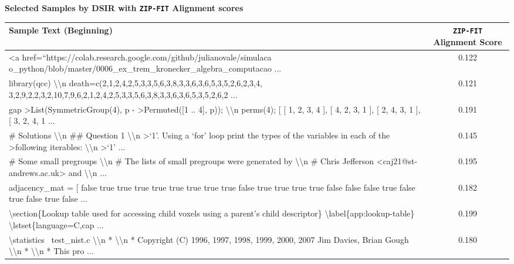 \begin{table}[htbp]
    \centering
    \textbf{Selected Samples by DSIR with \texttt{ZIP-FIT} Alignment scores}\\[0.5em] 
    \begin{tabular}{|p{10cm}|c|}
        \hline
        \textbf{Sample Text (Beginning)} & \textbf{\texttt{ZIP-FIT} Alignment Score} \\ \hline
        \textless a href=``https://colab.research.google.com/github/julianovale/simulaca
        o\_python/blob/master/0006\_ex\_trem\_kronecker\_algebra\_computacao ... & 0.122 \\ 
        \hline
        library(qcc) \textbackslash\textbackslash n
        death=c(2,1,2,4,2,5,3,3,5,6,3,8,3,3,6,3,6,5,3,5,2,6,2,3,4,
        3,2,9,2,2,3,2,10,7,9,6,2,1,2,4,2,5,3,3,5,6,3,8,3,3,6,3,6,5,3,5,2,6,2 ... & 0.121 \\ 
        \hline
        gap \textgreater List(SymmetricGroup(4), p - \textgreater Permuted([1 .. 4], p)); \textbackslash\textbackslash n perms(4);
        [ [ 1, 2, 3, 4 ], [ 4, 2, 3, 1 ], [ 2, 4, 3, 1 ], [ 3, 2, 4, 1 ... & 0.191 \\
        \hline
        \# Solutions \textbackslash\textbackslash n
        \#\# Question 1 \textbackslash\textbackslash n
        \textgreater `1'. Using a `for' loop print the types of the variables in each of the
        \textgreater following iterables: \textbackslash\textbackslash n
        \textgreater  `1' ... & 0.145 \\
        \hline
        \# Some small pregroups \textbackslash\textbackslash n \# The lists of small pregroups were generated by \textbackslash\textbackslash n
        \# Chris Jefferson <caj21@st-andrews.ac.uk> and \textbackslash\textbackslash n ... & 0.195 \\ 
        \hline
        adjacency\_mat = [
        false true true true true true true true true false true true true true false 
        false false true false true false true false ... & 0.182 \\
        \hline
        \textbackslash section\{Lookup table used for accessing child voxels using a parent's 
        child descriptor\}
        \textbackslash label\{app:lookup-table\}
        \textbackslash lstset\{language=C,cap ... & 0.199 \\
        \hline
        \textbackslash* statistics \ test\_nist.c \textbackslash\textbackslash n * \textbackslash\textbackslash n * Copyright (C) 1996, 1997, 1998, 1999, 2000, 2007 Jim Davies, Brian Gough         \textbackslash\textbackslash n *         \textbackslash\textbackslash n * This pro ... & 0.180 \\

\end{tabular}
\end{table}
